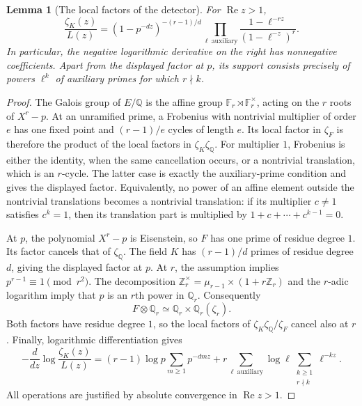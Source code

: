 \documentclass[11pt]{article}
\newtheorem{lemma}[theorem]{Lemma}
\theoremstyle{definition}
\theoremstyle{remark}
\begin{document}
\begin{lemma}[The local factors of the detector]
\label{lem:kummer-detector-local}
For $\operatorname{Re}z>1$,
\begin{equation}\label{eq:kummer-detector-euler}
 \frac{\zeta_K(z)}{L(z)}
 =(1-p^{-dz})^{-(r-1)/d}
   \prod_{\ell\ \mathrm{auxiliary}}
       \frac{1-\ell^{-rz}}{(1-\ell^{-z})^r}.
\end{equation}
In particular, the negative logarithmic derivative on the right has
nonnegative coefficients.  Apart from the displayed factor at $p$,
its support consists precisely of powers $\ell^k$ of auxiliary
primes for which $r\nmid k$.
\end{lemma}
\begin{proof}
The Galois group of $E/\mathbb Q$ is the affine group
$\mathbb F_r\rtimes\mathbb F_r^\times$, acting on the $r$
roots of $X^r-p$.  At an unramified prime, a Frobenius with
nontrivial multiplier of order $e$ has one fixed point and
$(r-1)/e$ cycles of length $e$.  Its local factor in $\zeta_F$
is therefore the product of the local factors in
$\zeta_K\zeta_{\mathbb Q}$.  For multiplier $1$, Frobenius
is either the identity, when the same cancellation occurs, or
a nontrivial translation, which is an $r$-cycle.  The latter
case is exactly the auxiliary-prime condition and gives the
displayed factor.  Equivalently, no power of an affine element
outside the nontrivial translations becomes a nontrivial
translation: if its multiplier $c\ne1$ satisfies $c^k=1$,
then its translation part is multiplied by
$1+c+\cdots+c^{k-1}=0$.

At $p$, the polynomial $X^r-p$ is Eisenstein, so $F$ has
one prime of residue degree $1$.  Its factor cancels that of
$\zeta_{\mathbb Q}$.  The field $K$ has $(r-1)/d$ primes
of residue degree $d$, giving the displayed factor at $p$.
At $r$, the assumption implies $p^{r-1}\equiv1\pmod{r^2}$.
The decomposition
$\mathbb Z_r^\times=\mu_{r-1}\times(1+r\mathbb Z_r)$
and the $r$-adic logarithm imply that $p$ is an $r$th power
in $\mathbb Q_r$.  Consequently
\[
 F\otimes\mathbb Q_r\simeq
 \mathbb Q_r\times\mathbb Q_r(\zeta_r).
\]
Both factors have residue degree $1$, so the local factors
of $\zeta_K\zeta_{\mathbb Q}/\zeta_F$ cancel also at $r$.
Finally, logarithmic differentiation gives
\[
 -\frac{d}{dz}\log\frac{\zeta_K(z)}{L(z)}
 =(r-1)\log p\sum_{m\geq1}p^{-dmz}
 +r\sum_{\ell\ \mathrm{auxiliary}}\log\ell
       \sum_{\substack{k\geq1\\r\nmid k}}\ell^{-kz}.
\]
All operations are justified by absolute convergence in
$\operatorname{Re}z>1$.
\end{proof}
\end{document}
